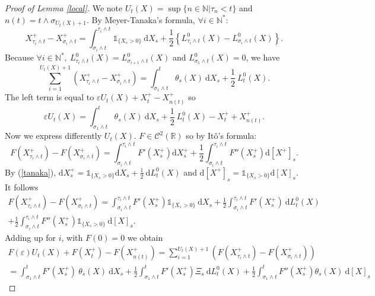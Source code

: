 \documentclass[11pt]{enstaPRE}
\newcommand{\R}{\mathbb{R}}
\newcommand{\N}{\mathbb{N}}
\newcommand{\di}{\mathrm{d}}
\begin{document}
\begin{proof}[Proof of Lemma \ref{local}]
    We note $U_t(X) = \sup\{n\in\N|\tau_n<t\}$ and $n(t) = t \wedge \sigma_{U_t(X)+1}$. By Meyer-Tanaka's formula, $\forall i\in \N^*$:        
    \begin{equation}\label{tanaka}
    X^+_{\tau_i\wedge t} - X^+_{\sigma_i\wedge t} = \int_{\sigma_i\wedge t}^{\tau_i\wedge t} \mathds{1}_{\{X_s>0\}}\ \di X_s + \frac{1}{2}\left\{L^0_{\tau_i\wedge t}(X)-L^0_{\sigma_i\wedge t}(X)\right\}.
    \end{equation}        
    Because $\forall i\in\N^*,\ L^0_{\tau_{i}\wedge t}(X)=L^0_{\sigma_{i+1}\wedge t}(X)$ and $L^0_{\sigma_1\wedge t}(X)=0$, we have        
    \begin{equation*}
    \sum_{i=1}^{U_t(X)+1}\left(X^+_{\tau_i\wedge t} - X^+_{\sigma_i\wedge t}\right) = \int_{\sigma_1\wedge t}^{t} \theta_s(X)\ \di X_s + \frac{1}{2}\ L^0_{t}(X).
    \end{equation*}
    The left term is equal to $\varepsilon U_t(X)+X^+_t-X^+_{n(t)}$ so
    \begin{equation}\label{Ut}
    \varepsilon U_t(X) = \int_{\sigma_1\wedge t}^{t} \theta_s(X)\ \di X_s + \frac{1}{2}\ L^0_{t}(X) - X^+_t + X^+_{n(t)}.
    \end{equation}
    Now we express differently $U_t(X)$. $F\in\mathcal{C}^2(\R)$ so by Itô's formula:
    \begin{equation*}
    F\left(X^+_{\tau_i\wedge t}\right) - F\left(X^+_{\sigma_i\wedge t}\right) = \int_{\sigma_i\wedge t}^{\tau_i\wedge t} F'\left(X_s^+\right) \di X_s^+ + \frac{1}{2}\int_{\sigma_i\wedge t}^{\tau_i\wedge t} F''\left(X_s^+\right) \di [X^+]_s.
    \end{equation*}
    By (\ref{tanaka}), $\di X_s^+ = \mathds{1}_{\{X_s>0\}}\di X_s + \frac{1}{2}\ \di L^0_t(X)$ and $\di[X^+]_s = \mathds{1}_{\{X_s>0\}}\di[X]_s$. It follows
    \begin{multline*}
    F\left(X^+_{\tau_i\wedge t}\right) - F\left(X^+_{\sigma_i\wedge t}\right) = \int_{\sigma_i\wedge t}^{\tau_i\wedge t} F'\left(X_s^+\right) \mathds{1}_{\{X_s>0\}}\ \di X_s + \frac{1}{2}\int_{\sigma_i\wedge t}^{\tau_i\wedge t} F'(X_s^+)\ \di L^0_t(X)\\ + \frac{1}{2}\int_{\sigma_i\wedge t}^{\tau_i\wedge t} F''\left(X_s^+\right) \mathds{1}_{\{X_s>0\}}\ \di [X]_s.
    \end{multline*}
    Adding up for $i$, with $F(0) = 0$ we obtain
    \begin{multline*}
    F(\varepsilon)U_t(X)+F\left(X^+_t\right)-F\left(X^+_{n(t)}\right) = \sum_{i=1}^{U_t(X)+1} \left(F\left(X^+_{\tau_i\wedge t}\right) - F\left(X^+_{\sigma_i\wedge t}\right)\right)\\=\int_{\sigma_1\wedge t}^{ t} F'(X_s^+)\ \theta_s(X)\ \di X_s + \frac{1}{2}\int_{\sigma_1\wedge t}^{t} F'\left(X_s^+\right)\Xi_s\ \di L^0_t(X) + \frac{1}{2}\int_{\sigma_1\wedge t}^{t} F''\left(X_s^+\right)\theta_s(X)\ \di [X]_s

\end{multline*}
\end{proof}
\end{document}
